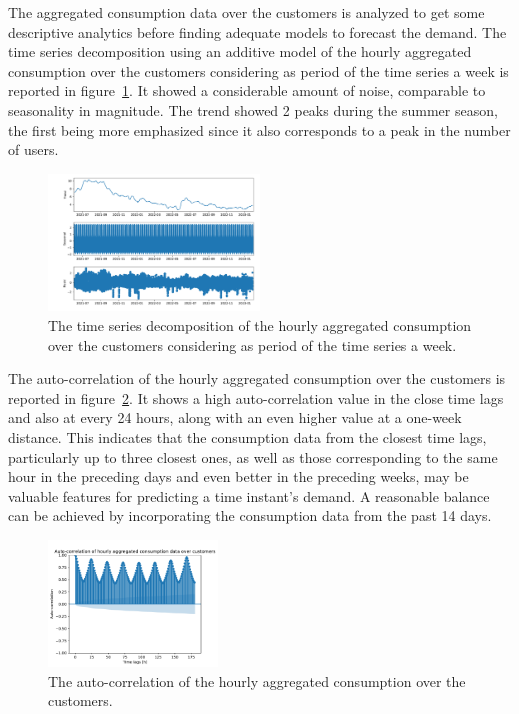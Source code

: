 The aggregated consumption data over the customers is analyzed to get some descriptive analytics before finding adequate models to forecast the demand.
The time series decomposition using an additive model of the hourly aggregated consumption over the customers considering as period of the time series a week is reported in figure~\ref{fig:demanddecomposition}.
It showed a considerable amount of noise, comparable to seasonality in magnitude.
The trend showed 2 peaks during the summer season, the first being more emphasized since it also corresponds to a peak in the number of users.

\begin{figure}[H]
\centering
\includegraphics[width=0.5\textwidth]{images/demand/hourly_decomposition_week_period}
\caption{The time series decomposition of the hourly aggregated consumption over the customers considering as period of the time series a week.}
\label{fig:demanddecomposition}
\end{figure}

The auto-correlation of the hourly aggregated consumption over the customers is reported in figure~\ref{fig:demandcorrelation}.
It shows a high auto-correlation value in the close time lags and also at every 24 hours, along with an even higher value at a one-week distance.
This indicates that the consumption data from the closest time lags, particularly up to three closest ones, as well as those corresponding to the same hour in the preceding days and even better in the preceding weeks, may be valuable features for predicting a time instant's demand.
A reasonable balance can be achieved by incorporating the consumption data from the past 14 days.

\begin{figure}[H]
\centering
\includegraphics[width=0.4\textwidth]{images/demand/hourly_correlation_week_range}
\caption{The auto-correlation of the hourly aggregated consumption over the customers.}
\label{fig:demandcorrelation}
\end{figure}

